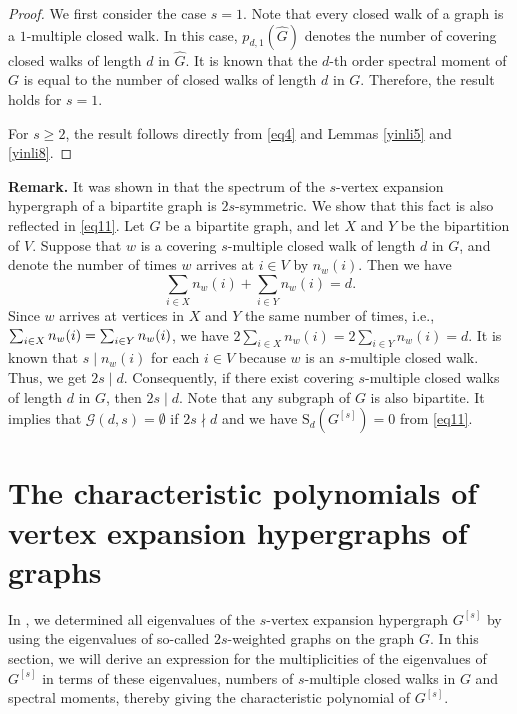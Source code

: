 \documentclass{article}
\begin{document}
\begin{proof}
We first consider the case $s=1$. 
Note that every closed walk of a graph is a $1$-multiple closed walk.
In this case,
$p_{d,1}(\widehat{G})$ denotes the number of covering closed walks of length $d$ in $\widehat{G}$. 
It is known that the $d$-th order spectral moment of $G$ is equal to the number of
closed walks of length $d$ in $G$. 
Therefore,
the result holds for $s=1$. 

For $s\geq2$, 
the result follows directly from \eqref{eq4} and Lemmas \ref{yinli5} and \ref{yinli8}.
\end{proof}

\noindent\textbf{Remark.}
It was shown in \cite{fan2019spectral} that the spectrum of the $s$-vertex expansion hypergraph of a bipartite graph is $2s$-symmetric.
We show that this fact is also reflected in \eqref{eq11}.
Let $G$ be a bipartite graph,
and let $X$ and $Y$ be the bipartition of $V$.
Suppose that $w$ is a covering $s$-multiple closed walk of length $d$ in $G$,
and denote the number of times $w$ arrives at $i \in V$ by $n_{w}(i)$.
Then we have $$\sum_{i \in X}n_{w}(i)+\sum_{i \in Y}n_{w}(i)=d.$$
Since $w$ arrives at vertices in $X$ and $Y$ the same number of times,
i.e., $\sum_{i \in X}n_{w}(i)\\=\sum_{i \in Y}n_{w}(i)$,
we have $2\sum_{i \in X}n_{w}(i)=2\sum_{i \in Y}n_{w}(i)=d$.
It is known that $s \mid n_{w}(i)$ for each $i \in V$ because $w$ is an $s$-multiple closed walk.
Thus,
we get $2s \mid d$.
Consequently,
if there exist covering $s$-multiple closed walks of length $d$ in $G$,
then $2s \mid d$.
Note that any subgraph of $G$ is also bipartite.
It implies that $\mathcal{G}(d,s)=\emptyset$ if $2s \nmid d$ and we have $\mathrm{S}_{d}(G^{[s]})=0$ from \eqref{eq11}.

\section{The characteristic polynomials of vertex expansion hypergraphs of graphs}

In \cite{lin2026eigenvalue},
we determined all eigenvalues of the $s$-vertex expansion hypergraph $G^{[s]}$ by using the eigenvalues of so-called $2s$-weighted graphs on the graph $G$.
In this section,
we will derive an expression for the multiplicities of the eigenvalues of $G^{[s]}$ in terms of these eigenvalues, numbers of $s$-multiple closed walks in $G$ and spectral moments,
thereby giving the characteristic polynomial of $G^{[s]}$.
\end{document}
